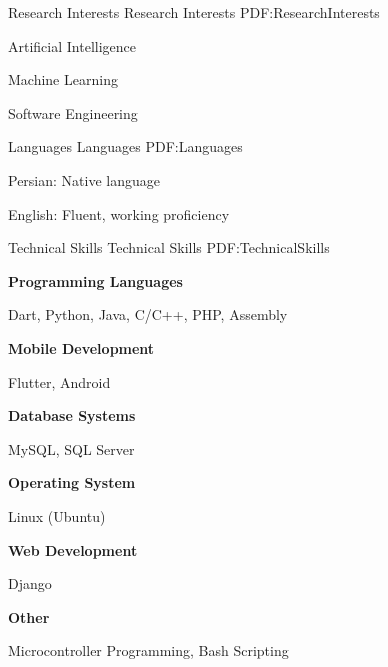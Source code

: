 \documentclass[letterpaper,MMMyyyy,nonstopmode]{simpleresumecv}
\begin{document}
\begin{Body}
\begin{multicols}{2}
\begin{itemize}[leftmargin=*]

\Section
{Research Interests}
{Research Interests}
{PDF:ResearchInterests}

\BulletItem
Artificial Intelligence

\BulletItem
Machine Learning

\BulletItem
Software Engineering

\columnbreak


\Section
{Languages}
{Languages}
{PDF:Languages}

\BulletItem
Persian: Native language

\BulletItem
English: Fluent, working proficiency

\end{itemize}
\end{multicols}


\Section
{Technical Skills}
{Technical Skills}
{PDF:TechnicalSkills}

\begin{multicols}{2}
\begin{itemize}[leftmargin=*]
\BulletItem
\textbf{Programming Languages}
\begin{Detail}
\Item
Dart, Python, Java, C/C++, PHP, Assembly
\end{Detail}

\BulletItem
\textbf{Mobile Development}
\begin{Detail}
\Item
Flutter, Android
\end{Detail}

\BulletItem
\textbf{Database Systems}
\begin{Detail}
\Item
MySQL, SQL Server
\end{Detail}

\columnbreak

\BulletItem
\textbf{Operating System}
\begin{Detail}
\Item
Linux (Ubuntu)
\end{Detail}

\BulletItem
\textbf{Web Development}
\begin{Detail}
\Item
Django
\end{Detail}

\BulletItem
\textbf{Other}
\begin{Detail}
\Item
Microcontroller Programming, Bash Scripting
\end{Detail}


\end{itemize}
\end{multicols}
\end{Body}
\end{document}
